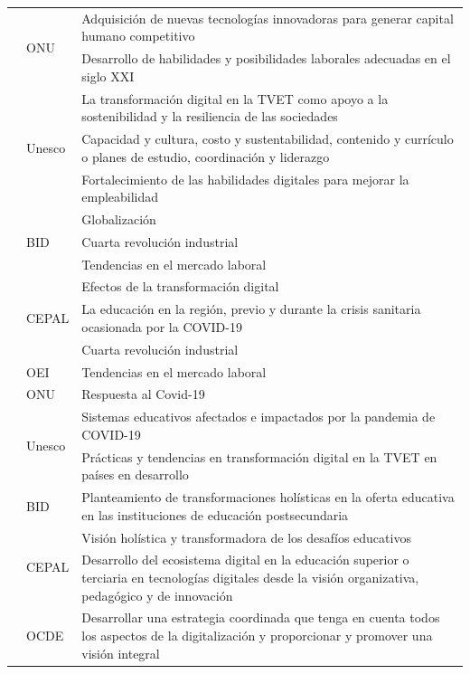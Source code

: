 \begin{longtable}{
>{\raggedright\arraybackslash}p{} l >{\raggedright\arraybackslash}p{}}
    & \multirow{2}{*}{ONU} & Adquisición de nuevas tecnologías innovadoras
    para generar capital humano competitivo \\
    & & Desarrollo de habilidades y posibilidades laborales adecuadas en el
    siglo XXI \\
    & \multirow{3}{*}{Unesco} & La transformación digital en la TVET como
    apoyo a la sostenibilidad y la resiliencia de las sociedades \\
    & & Capacidad y cultura, costo y sustentabilidad, contenido y currículo
    o planes de estudio, coordinación y liderazgo \\
    & & Fortalecimiento de las habilidades digitales para mejorar la
    empleabilidad \\
\midrule
    \multirow{10}{=}{Contexto} & \multirow{3}{*}{BID} &
    Globalización \\
    & & Cuarta revolución industrial \\
    & & Tendencias en el mercado laboral \\
    & \multirow{3}{*}{CEPAL} & Efectos de la transformación digital \\
    & & La educación en la región, previo y durante la crisis sanitaria
    ocasionada por la COVID-19 \\
    & & Cuarta revolución industrial \\
    & OEI & Tendencias en el mercado laboral \\
    & ONU & Respuesta al Covid-19 \\
    & \multirow{2}{*}{Unesco} & Sistemas educativos afectados e impactados
    por la pandemia de COVID-19 \\
    & & Prácticas y tendencias en transformación digital en la TVET en
    países en desarrollo \\
\midrule
    \multirow{9}{=}{Visión de la TD} & BID & Planteamiento de
    transformaciones holísticas en la oferta educativa en las instituciones
    de educación postsecundaria \\
    & \multirow{2}{*}{CEPAL} & Visión holística y transformadora de los
    desafíos educativos \\
    & & Desarrollo del ecosistema digital en la educación superior o
    terciaria en tecnologías digitales desde la visión organizativa,
    pedagógico y de innovación \\
    & \multirow{2}{*}{OCDE} & Desarrollar una estrategia coordinada que
    tenga en cuenta todos los aspectos de la digitalización y proporcionar y
    promover una visión integral \\

\end{longtable}
